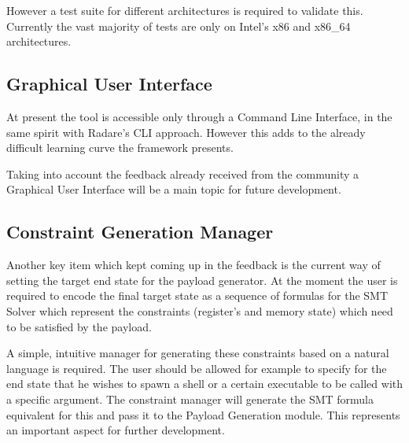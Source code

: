 However a test suite for different architectures is required to validate this. Currently the vast majority of tests are only on Intel's x86 and x86_64 architectures.

\subsection{Graphical User Interface}

At present the tool is accessible only through a Command Line Interface, in the same spirit with Radare's CLI approach. However this adds to the already difficult learning curve the framework presents.

Taking into account the feedback already received from the community a Graphical User Interface will be a main topic for future development.

\subsection{Constraint Generation Manager}

Another key item which kept coming up in the feedback is the current way of setting the target end state for the payload generator. At the moment the user is required to encode the final target state as a sequence of formulas for the SMT Solver which represent the constraints (register's and memory state) which need to be satisfied by the payload.

A simple, intuitive manager for generating these constraints based on a natural language is required. The user should be allowed for example to specify for the end state that he wishes to spawn a shell or a certain executable to be called with a specific argument. The constraint manager will generate the SMT formula equivalent for this and pass it to the Payload Generation module. This represents an important aspect for further development.


